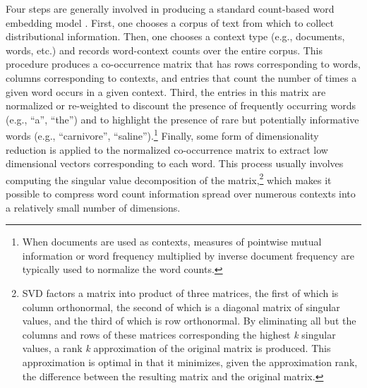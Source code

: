 Four steps are generally involved in producing a standard count-based word embedding model \citep{TurneyPantel:2010,LandauerDumais:1997,Baroni:2014}. First, one chooses a corpus of text from which to collect distributional information. Then, one chooses a context type (e.g., documents, words, etc.) and records word-context counts over the entire corpus. This procedure produces a co-occurrence matrix that has rows corresponding to words, columns corresponding to contexts, and entries that count the number of times a given word occurs in a given context. Third, the entries in this matrix are normalized or re-weighted to discount the presence of frequently occurring words (e.g., ``a'', ``the'') and to highlight the presence of rare but potentially informative words (e.g., ``carnivore'', ``saline'').\footnote{When documents are used as contexts, measures of pointwise mutual information or word frequency multiplied by inverse document frequency are typically used to normalize the word counts.} Finally, some form of dimensionality reduction is applied to the normalized co-occurrence matrix to extract low dimensional vectors corresponding to each word. This process usually involves computing the singular value decomposition of the matrix,\footnote{SVD factors a matrix into product of three matrices, the first of which is column orthonormal, the second of which is a diagonal matrix of singular values, and the third of which is row orthonormal. By eliminating all but the columns and rows of these matrices corresponding the highest \textit{k} singular values, a rank \textit{k} approximation of the original matrix is produced. This approximation is optimal in that it minimizes, given the approximation rank, the difference between the resulting matrix and the original matrix.} which makes it possible to compress word count information spread over numerous contexts into a relatively small number of dimensions.

